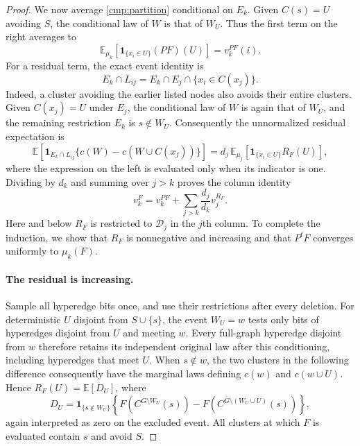 \documentclass[11pt]{article}
\theoremstyle{definition}
\theoremstyle{remark}
\numberwithin{equation}{section}
\begin{document}
\begin{proof}
We now average \eqref{cmp:partition} conditional on $E_k$. Given
$C(s)=U$ avoiding $S$, the conditional law of $W$ is that of $W_U$.
Thus the first term on the right averages to
\[
 \mathbb E_{\mu_k}[\mathbf 1_{\{x_i\in U\}}(PF)(U)]
 =v_k^{PF}(i).
\]
For a residual term, the exact event identity is
\[
 E_k\cap L_{ij}
 =E_k\cap E_j\cap\{x_i\in C(x_j)\}.
\]
Indeed, a cluster avoiding the earlier listed nodes also avoids their entire
clusters. Given $C(x_j)=U$ under $E_j$, the conditional law of $W$ is again
that of $W_U$, and the remaining restriction $E_k$ is $s\notin W_U$.
Consequently the unnormalized residual expectation is
\[
 \mathbb E\!\left[
  \mathbf 1_{E_k\cap L_{ij}}
   \{c(W)-c(W\cup C(x_j))\}\right]
 =d_j\,\mathbb E_{\mu_j}
       [\mathbf 1_{\{x_i\in U\}}R_F(U)],
\]
where the expression on the left is evaluated only when its indicator is one.
Dividing by $d_k$ and summing over $j>k$ proves the column identity
\begin{equation}\label{cmp:column-identity}
 v_k^F=v_k^{PF}+\sum_{j>k}\frac{d_j}{d_k}v_j^{R_F}.
\end{equation}
Here and below $R_F$ is restricted to $\mathcal D_j$ in the $j$th column.
To complete the induction, we show that $R_F$ is nonnegative and increasing
and that $P^tF$ converges uniformly to $\mu_k(F)$.

\paragraph{The residual is increasing.}
Sample all hyperedge bits once, and use their restrictions after every
deletion. For deterministic $U$ disjoint from $S\cup\{s\}$, the event
$W_U=w$ tests only bits of hyperedges disjoint from $U$ and meeting $w$.
Every full-graph hyperedge disjoint from $w$ therefore retains its independent
original law after this conditioning, including hyperedges that meet $U$.
When $s\notin w$, the two clusters in the following difference consequently
have the marginal laws defining $c(w)$ and $c(w\cup U)$.
Hence $R_F(U)=\mathbb E[D_U]$, where
\begin{equation}\label{cmp:residual-sample}
 D_U=\mathbf 1_{\{s\notin W_U\}}
 \left\{F(C^{G\setminus W_U}(s))
       -F(C^{G\setminus(W_U\cup U)}(s))\right\},
\end{equation}
again interpreted as zero on the excluded event. All clusters at which
$F$ is evaluated contain $s$ and avoid $S$.


\end{proof}
\end{document}
